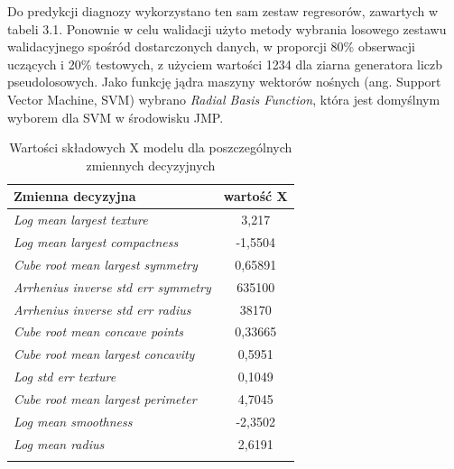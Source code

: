 Do predykcji diagnozy wykorzystano ten sam zestaw regresorów, zawartych w tabeli 3.1. Ponownie w celu walidacji użyto metody wybrania losowego zestawu walidacyjnego spośród dostarczonych danych, w proporcji 80\% obserwacji uczących i 20\% testowych, z użyciem wartości 1234 dla ziarna generatora liczb pseudolosowych. Jako funkcję jądra maszyny wektorów nośnych (ang. Support Vector Machine, SVM) wybrano \textit{Radial Basis Function}, która jest domyślnym wyborem dla SVM w środowisku JMP. 

\begin{longtable}{l | c}
	\centering
	Zmienna decyzyjna & wartość X \\
	\hline
	\textit{Log mean largest texture} & 3,217 \\
	\textit{Log mean largest compactness} & -1,5504 \\
	\textit{Cube root mean largest symmetry} & 0,65891 \\
	\textit{Arrhenius inverse std err symmetry} & 635100 \\
	\textit{Arrhenius inverse std err radius} & 38170 \\
	\textit{Cube root mean concave points} & 0,33665 \\
	\textit{Cube root mean largest concavity} & 0,5951 \\
	\textit{Log std err texture} & 0,1049 \\
	\textit{Cube root mean largest perimeter} & 4,7045 \\
	\textit{Log mean smoothness} & -2,3502 \\
	\textit{Log mean radius} & 2,6191 \\
	\caption{Wartości składowych X modelu dla poszczególnych zmiennych decyzyjnych}
	\label{svm:1}
\end{longtable} 

